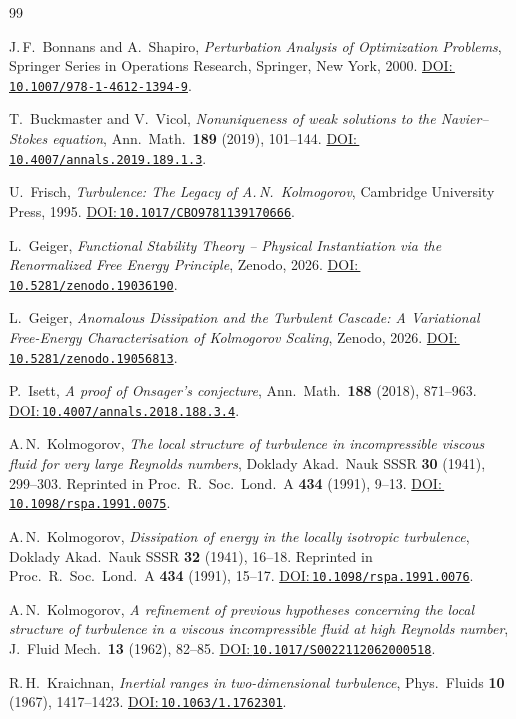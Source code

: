 \documentclass[12pt,a4paper]{article}
\newcommand{\doilink}[1]{\href{https://doi.org/#1}{DOI:\,\nolinkurl{#1}}}
\theoremstyle{definition}
\theoremstyle{plain}
\theoremstyle{remark}
\begin{document}
\begingroup
\small
\sloppy
\setlength{\itemsep}{0.18em}
\begin{thebibliography}{99}

J.\,F.~Bonnans and A.~Shapiro,
\emph{Perturbation Analysis of Optimization Problems},
Springer Series in Operations Research, Springer, New York, 2000.
\doilink{10.1007/978-1-4612-1394-9}.

T.~Buckmaster and V.~Vicol,
\emph{Nonuniqueness of weak solutions to the Navier--Stokes equation},
Ann.\ Math.\ \textbf{189} (2019), 101--144.
\doilink{10.4007/annals.2019.189.1.3}.

U.~Frisch,
\emph{Turbulence: The Legacy of A.\,N.\ Kolmogorov},
Cambridge University Press, 1995.
\doilink{10.1017/CBO9781139170666}.

L.~Geiger, \emph{Functional Stability Theory -- Physical Instantiation via the Renormalized Free Energy Principle},
Zenodo, 2026.
\doilink{10.5281/zenodo.19036190}.

L.~Geiger,
\emph{Anomalous Dissipation and the Turbulent Cascade: A Variational Free-Energy Characterisation of Kolmogorov Scaling},
Zenodo, 2026.
\doilink{10.5281/zenodo.19056813}.

P.~Isett,
\emph{A proof of Onsager's conjecture},
Ann.\ Math.\ \textbf{188} (2018), 871--963.
\doilink{10.4007/annals.2018.188.3.4}.

A.\,N.~Kolmogorov,
\emph{The local structure of turbulence in incompressible viscous fluid
for very large Reynolds numbers},
Doklady Akad.\ Nauk SSSR \textbf{30} (1941), 299--303.
Reprinted in Proc.\ R.\ Soc.\ Lond.\ A \textbf{434} (1991), 9--13.
\doilink{10.1098/rspa.1991.0075}.

A.\,N.~Kolmogorov,
\emph{Dissipation of energy in the locally isotropic turbulence},
Doklady Akad.\ Nauk SSSR \textbf{32} (1941), 16--18.
Reprinted in Proc.\ R.\ Soc.\ Lond.\ A \textbf{434} (1991), 15--17.
\doilink{10.1098/rspa.1991.0076}.

A.\,N.~Kolmogorov,
\emph{A refinement of previous hypotheses concerning the local structure
of turbulence in a viscous incompressible fluid at high Reynolds number},
J.~Fluid Mech.\ \textbf{13} (1962), 82--85.
\doilink{10.1017/S0022112062000518}.

R.\,H.~Kraichnan,
\emph{Inertial ranges in two-dimensional turbulence},
Phys.\ Fluids \textbf{10} (1967), 1417--1423.
\doilink{10.1063/1.1762301}.


\end{thebibliography}
\end{document}
